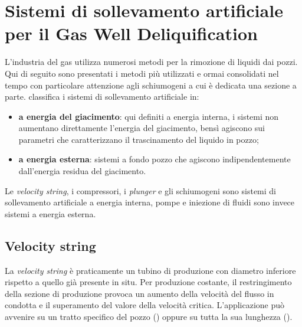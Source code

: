 \section[Sollevamento artificiale per GDW]{Sistemi di sollevamento artificiale per il Gas Well Deliquification}
L'industria del gas utilizza numerosi metodi per la rimozione di liquidi dai pozzi. Qui di seguito sono presentati i metodi più utilizzati e ormai consolidati nel tempo con particolare attenzione agli schiumogeni a cui è dedicata una sezione a parte. \textcite{oyewole2008artificial} classifica i sistemi di sollevamento artificiale in:
\begin{itemize}
    \item \textbf{a energia del giacimento}: qui definiti  a energia interna, i sistemi non aumentano direttamente l'energia del giacimento, bensì agiscono sui parametri che caratterizzano il trascinamento del liquido in pozzo;
    \item \textbf{a energia esterna}: sistemi a fondo pozzo che agiscono indipendentemente dall'energia residua del giacimento.
\end{itemize}
Le \textit{velocity string}, i compressori, i \textit{plunger} e gli schiumogeni sono sistemi di sollevamento artificiale a energia interna, pompe e iniezione di fluidi sono invece sistemi a energia esterna.

\subsection{Velocity string}
La \textit{velocity string} è praticamente un tubino di produzione con diametro inferiore rispetto a quello già presente in situ. Per produzione costante, il restringimento della sezione di produzione provoca un aumento della velocità del flusso in condotta e il superamento del valore della velocità critica. L'applicazione può avvenire su un tratto specifico del pozzo () oppure su tutta la sua lunghezza ().

